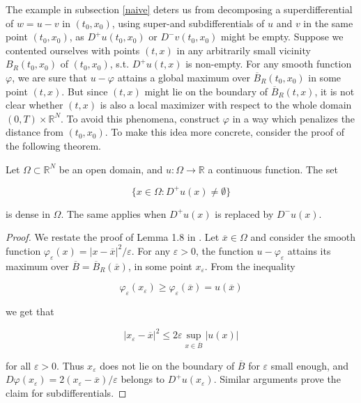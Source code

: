 The example in subsection \ref{naive} deters us from decomposing a superdifferential of $ w = u - v $ in $ (t_0, x_0) $, using super-and subdifferentials of $ u $ and $ v $ in the same point $ (t_0, x_0) $, as $ D^{+}u(t_0, x_0) $ or $ D^{-}v(t_0, x_0) $ might be empty. Suppose we contented ourselves with points $ (t, x) $ in any arbitrarily small vicinity $ B_R(t_0, x_0) $ of $ (t_0, x_0) $, s.t. $ D^{+}u(t, x) $ is non-empty. For any smooth function $ \varphi $, we are sure that $ u - \varphi $ attains a global maximum over $ \overline{B}_R(t_0, x_0) $ in some point $ (t, x) $. But since $ (t, x) $ might lie on the boundary of $ \overline{B}_R(t, x) $, it is not clear whether $ (t, x) $ is also a local maximizer with respect to the whole domain $ \left( 0, T \right) \times \mathbb{R}^{N} $. To avoid this phenomena, construct $ \varphi $ in a way which penalizes the distance from $ (t_0, x_0) $. To make this idea more concrete, consider the proof of the following theorem.
		
		\begin{theorem}
			\label{density}
			Let $ \Omega \subset \mathbb{R}^{N} $ be an open domain, and $ u : \Omega \to \mathbb{R} $ a continuous function. The set
			
			\begin{equation*}
				\big\{ x \in \Omega : D^{+}u(x) \neq \emptyset \big\}
			\end{equation*}
			
			is dense in $ \Omega $. The same applies when $ D^{+}u(x) $ is replaced by $ D^{-}u(x) $.
			
			\begin{proof}
				We restate the proof of Lemma 1.8 in \cite[p.~30]{bardi2008optimal}. Let $ \overline{x} \in \Omega $ and consider the smooth function $ \varphi_{\varepsilon}(x) = \lvert x - \overline{x} \rvert^2 /  \varepsilon $. For any $ \varepsilon > 0 $, the function $ u - \varphi_{\varepsilon} $ attains its maximum over $ \overline{B} = \overline{B}_R(\overline{x}) $, in some point $ x_{\varepsilon} $. From the inequality
				
				\begin{equation*}
					\varphi_{\varepsilon}(x_{\varepsilon}) \geq \varphi_{\varepsilon}(\overline{x}) = u(\overline{x})
				\end{equation*}
				
				we get that
				
				\begin{equation*}
					\lvert x_{\varepsilon} - \overline{x} \rvert^2 \leq 2 \varepsilon \sup\limits_{x \in \overline{B}} \lvert u(x) \rvert 
				\end{equation*}
				
				for all $ \varepsilon > 0 $. Thus $ x_{\varepsilon} $ does not lie on the boundary of $ \overline{B} $ for $ \varepsilon $ small enough, and $ D\varphi(x_{\varepsilon}) = 2(x_{\varepsilon} - \overline{x}) / \varepsilon $ belongs to $ D^{+}u(x_{\varepsilon}) $. Similar arguments prove the claim for subdifferentials.
			\end{proof}
		\end{theorem}
	

